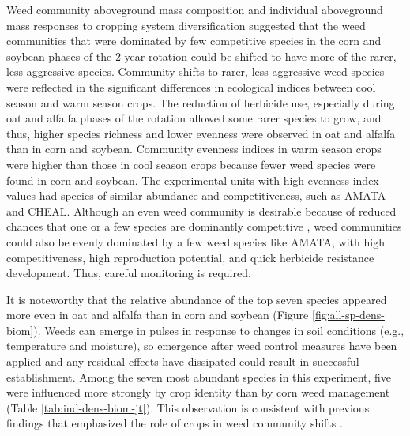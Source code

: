 \documentclass[
]{article}
\begin{document}
Weed community aboveground mass composition and individual aboveground mass responses to cropping system diversification suggested that the weed communities that were dominated by few competitive species in the corn and soybean phases of the 2-year rotation could be shifted to have more of the rarer, less aggressive species. Community shifts to rarer, less aggressive weed species were reflected in the significant differences in ecological indices between cool season and warm season crops. The reduction of herbicide use, especially during oat and alfalfa phases of the rotation allowed some rarer species to grow, and thus, higher species richness and lower evenness were observed in oat and alfalfa than in corn and soybean. Community evenness indices in warm season crops were higher than those in cool season crops because fewer weed species were found in corn and soybean. The experimental units with high evenness index values had species of similar abundance and competitiveness, such as AMATA and CHEAL. Although an even weed community is desirable because of reduced chances that one or a few species are dominantly competitive \citep{adeuxMitigatingCropYield2019}, weed communities could also be evenly dominated by a few weed species like AMATA, with high competitiveness, high reproduction potential, and quick herbicide resistance development. Thus, careful monitoring is required.

It is noteworthy that the relative abundance of the top seven species appeared more even in oat and alfalfa than in corn and soybean (Figure \ref{fig:all-sp-dens-biom}). Weeds can emerge in pulses in response to changes in soil conditions (e.g., temperature and moisture), so emergence after weed control measures have been applied and any residual effects have dissipated could result in successful establishment. Among the seven most abundant species in this experiment, five were influenced more strongly by crop identity than by corn weed management (Table \ref{tab:ind-dens-biom-jt}). This observation is consistent with previous findings that emphasized the role of crops in weed community shifts \citep{davisWeedSeedbankCommunity2005, smithAssemblyWeedCommunities2007, owenWeedSpeciesShifts2008, friedTrajectoriesWeedCommunities2012}.
\end{document}
